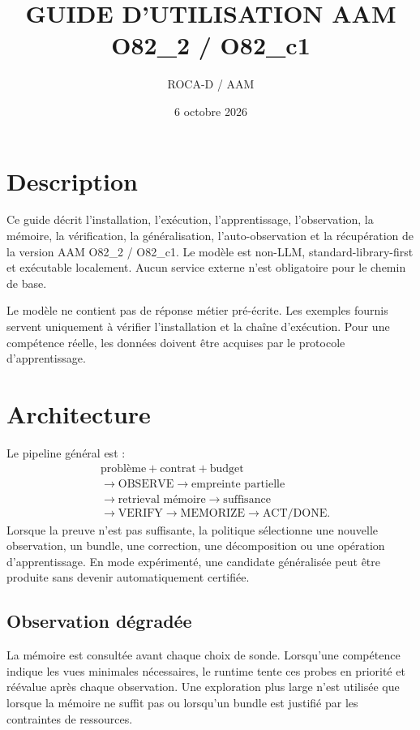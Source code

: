 \documentclass[11pt,a4paper]{report}
\title{GUIDE D'UTILISATION AAM O82\_2 / O82\_c1}
\author{ROCA-D / AAM}
\date{6 octobre 2026}
\begin{document}
\setlength{\emergencystretch}{2em}
\maketitle
\tableofcontents

\chapter{Description}
Ce guide décrit l'installation, l'exécution, l'apprentissage, l'observation, la mémoire, la vérification, la généralisation, l'auto-observation et la récupération de la version AAM O82\_2 / O82\_c1. Le modèle est non-LLM, standard-library-first et exécutable localement. Aucun service externe n'est obligatoire pour le chemin de base.

Le modèle ne contient pas de réponse métier pré-écrite. Les exemples fournis servent uniquement à vérifier l'installation et la chaîne d'exécution. Pour une compétence réelle, les données doivent être acquises par le protocole d'apprentissage.

\chapter{Architecture}
Le pipeline général est :
\begin{align*}
&\text{problème}+\text{contrat}+\text{budget}\\
&\rightarrow\text{OBSERVE}\rightarrow\text{empreinte partielle}\\
&\rightarrow\text{retrieval mémoire}\rightarrow\text{suffisance}\\
&\rightarrow\text{VERIFY}\rightarrow\text{MEMORIZE}\rightarrow\text{ACT/DONE}.
\end{align*}
Lorsque la preuve n'est pas suffisante, la politique sélectionne une nouvelle observation, un bundle, une correction, une décomposition ou une opération d'apprentissage. En mode expérimenté, une candidate généralisée peut être produite sans devenir automatiquement certifiée.

\section{Observation dégradée}
La mémoire est consultée avant chaque choix de sonde. Lorsqu'une compétence indique les vues minimales nécessaires, le runtime tente ces probes en priorité et réévalue après chaque observation. Une exploration plus large n'est utilisée que lorsque la mémoire ne suffit pas ou lorsqu'un bundle est justifié par les contraintes de ressources.
\end{document}
